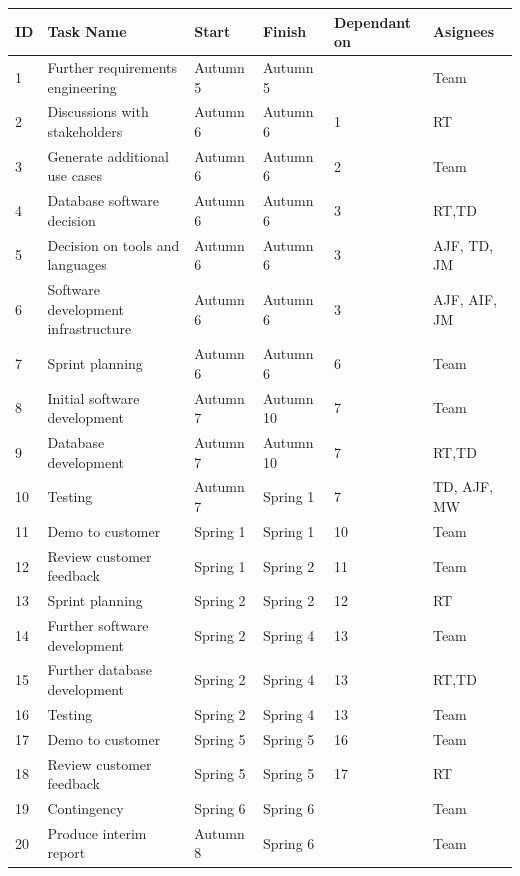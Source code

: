 \begin{longtable}{|p{0.6cm}|p{5.7cm}|p{1.35cm}|p{1.35cm}|p{1.8cm}|p{1.5cm}|}
	\hline
	\rowcolor{titleColor} \textbf{ID} & \textbf{Task Name} & \textbf{Start} & \textbf{Finish} & \textbf{Dependant on} & \textbf{Asignees} \\ \hline
	1 & Further requirements engineering & Autumn 5 & Autumn 5 &  & Team \\ \hline
	2 & Discussions with stakeholders & Autumn 6 & Autumn 6 & 1 & RT \\ \hline
	3 & Generate additional use cases & Autumn 6 & Autumn 6 & 2 & Team \\ \hline
	4 & Database software decision & Autumn 6 &  Autumn 6 &  3 & RT,TD \\ \hline
	5 & Decision on tools and languages & Autumn 6 & Autumn 6 & 3 & AJF, TD, JM \\ \hline
	6 & Software development infrastructure & Autumn 6 & Autumn 6 & 3 & AJF, AIF, JM \\ \hline
	7 & Sprint planning & Autumn 6 & Autumn 6 & 6 & Team \\ \hline
	8 & Initial software development & Autumn 7 & Autumn 10 & 7 & Team \\ \hline
	9 & Database development & Autumn 7 & Autumn 10 & 7 & RT,TD \\ \hline
	10 & Testing & Autumn 7 & Spring 1 & 7 & TD, AJF, MW \\ \hline
	11 & Demo to customer & Spring 1 & Spring 1 & 10 & Team \\ \hline
	12 & Review customer feedback & Spring 1 & Spring 2 & 11 & Team\\ \hline
	13 & Sprint planning & Spring 2 & Spring 2 & 12 & RT \\ \hline
	14 & Further software development & Spring 2 &  Spring 4& 13 & Team \\ \hline
	15 & Further database development & Spring 2 & Spring 4 & 13 & RT,TD \\ \hline
	16 & Testing & Spring 2 & Spring 4 & 13 & Team \\ \hline
	17 & Demo to customer & Spring 5 & Spring 5 & 16 & Team \\ \hline
	18 & Review customer feedback & Spring 5 & Spring 5 & 17 & RT \\ \hline
	19 & Contingency & Spring 6 & Spring 6 &  & Team \\ \hline
	20 & Produce interim report & Autumn 8 & Spring 6 & & Team \\ \hline
\end{longtable}
